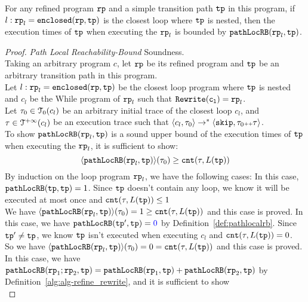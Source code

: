 \begin{lemma}
    For any refined program $\mathtt{rp}$ and a simple transition path $\mathtt{tp}$ in this program,
    if $l: \mathtt{rp}_l = \mathtt{enclosed}(\mathtt{rp}, \mathtt{tp})$ is the closest loop where $\mathtt{tp}$ is nested,
    then the execution times of $\mathtt{tp}$ when executing the $\mathtt{rp}_l$ is bounded by $\mathtt{pathLocRB}(\mathtt{rp}_l, \mathtt{tp})$.
  \end{lemma}
\begin{proof}
\emph{Path Local Reachability-Bound} Soundness.
\\
Taking an arbitrary program $c$, let $\mathtt{rp}$ be its refined program and $\mathtt{tp}$ be an arbitrary transition path in this program.
\\
Let $l: \mathtt{rp}_l = \mathtt{enclosed}(\mathtt{rp}, \mathtt{tp})$ be the closest loop program where $\mathtt{tp}$ is nested and $c_l$ be the While program of $\mathtt{rp}_l$ such that $\mathtt{Rewrite(c_l)} = \mathtt{rp}_l$. 
\\
Let $\mathtt{\tau}_0 \in \mathcal{T}_0(c_l)$ be an arbitrary initial trace of the closest loop $c_l$, and $\mathtt{\tau} \in \mathcal{T}^{+\infty}(c_l)$ be an execution trace such that $\langle c_l, \mathtt{\tau}_0 \rangle \to^* \langle \mathtt{skip}, \mathtt{\tau}_0 {\scriptscriptstyle ++} \mathtt{\tau} \rangle$.
\\
To show $\mathtt{pathLocRB}(\mathtt{rp}_l, \mathtt{tp})$ is a sound upper bound of the execution times of $\mathtt{tp}$ when executing the $\mathtt{rp}_l$, it is sufficient to show:
\[
  \langle \mathtt{pathLocRB}(\mathtt{rp}_l, \mathtt{tp}) \rangle(\mathtt{\tau}_0) \geq \mathtt{cnt}(\mathtt{\tau}, L(\mathtt{tp}))
  \]
By induction on the loop program $\mathtt{rp}_l$,
we have the following cases:
In this case, $\mathtt{pathLocRB}(\mathtt{tp}, \mathtt{tp}) = 1$. 
Since $\mathtt{tp}$ doesn't contain any loop, we know it will be executed at most once and $\mathtt{cnt}(\mathtt{\tau}, L(\mathtt{tp})) \leq 1$
\\
We have $\langle \mathtt{pathLocRB}(\mathtt{rp}_l, \mathtt{tp}) \rangle(\mathtt{\tau}_0) = 1 \geq \mathtt{cnt}(\mathtt{\tau}, L(\mathtt{tp})) $ and this case is proved.
In this case, we have $\outinB(\tpath', \tpath) = \highlight{0} $ by Definition~\ref{def:pathlocalrb}.
Since $\mathtt{tp}' \neq \mathtt{tp}$, we know $\mathtt{tp}$ isn't executed when executing $c_l$ and $\mathtt{cnt}(\mathtt{\tau}, L(\mathtt{tp})) = 0$.
\\
So we have $\langle \mathtt{pathLocRB}(\mathtt{rp}_l, \mathtt{tp}) \rangle(\mathtt{\tau}_0) = 0 = \mathtt{cnt}(\mathtt{\tau}, L(\mathtt{tp})) $ and this case is proved.
In this case, we have $\mathtt{pathLocRB}(\mathtt{rp}_1;\mathtt{rp}_2, \mathtt{tp}) = \mathtt{pathLocRB}(\mathtt{rp}_1, \mathtt{tp}) + \mathtt{pathLocRB}(\mathtt{rp}_2, \mathtt{tp}) $ by Definition~\ref{alg:alg-refine_rewrite}, and
it is sufficient to show
\[
\]
\end{proof}
